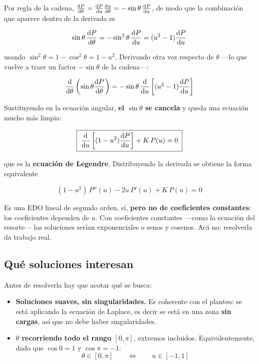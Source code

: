 \documentclass[12pt,a4paper]{article}
\begin{document}
Por regla de la cadena,
$\dv{P}{\theta} = \dv{P}{u}\dv{u}{\theta} = -\sin\theta\,\dv{P}{u}$, de modo que
la combinación que aparece dentro de la derivada es

\[
\sin\theta\,\dv{P}{\theta} = -\sin^2\theta\,\dv{P}{u} = (u^2 - 1)\dv{P}{u}
\]

usando $\sin^2\theta = 1 - \cos^2\theta = 1 - u^2$. Derivando otra vez respecto de
$\theta$ ---lo que vuelve a traer un factor $-\sin\theta$ de la cadena---:

\[
\dv{\theta}\left(\sin\theta\dv{P}{\theta}\right)
= -\sin\theta\,\dv{u}\left[(u^2-1)\dv{P}{u}\right]
\]

Sustituyendo en la ecuación angular, \textbf{el $\sin\theta$ se cancela} y queda
una ecuación mucho más limpia:

\[
\boxed{\;\dv{u}\left[(1-u^2)\dv{P}{u}\right] + K\,P(u) = 0\;}
\]

que es la \textbf{ecuación de Legendre}. Distribuyendo la derivada se obtiene la
forma equivalente

\[
(1-u^2)\,P''(u) - 2u\,P'(u) + K\,P(u) = 0
\]

\begin{warnbox}
Es una EDO lineal de segundo orden, sí, \textbf{pero no de coeficientes
constantes}: los coeficientes dependen de $u$. Con coeficientes constantes ---como
la ecuación del resorte--- las soluciones serían exponenciales o senos y cosenos.
Acá no: resolverla da trabajo real.
\end{warnbox}

\subsection{Qué soluciones interesan}

Antes de resolverla hay que acotar qué se busca:

\begin{itemize}[leftmargin=*]
  \item \textbf{Soluciones suaves, sin singularidades.} Es coherente con el
        planteo: se está aplicando la ecuación de Laplace, es decir se está en una
        zona \textbf{sin cargas}, así que no debe haber singularidades.
  \item \textbf{$\theta$ recorriendo todo el rango $[0,\pi]$}, extremos incluidos.
        Equivalentemente, dado que $\cos 0 = 1$ y $\cos\pi = -1$:
        \[
        \theta \in [0,\pi] \qquad\Longleftrightarrow\qquad u \in [-1,1]
        \]
\end{itemize}
\end{document}
